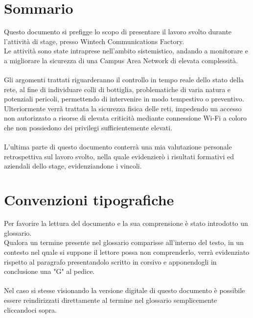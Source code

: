 \documentclass[Tesi.tex]{subfiles}
\begin{document}
\clearpage\thispagestyle{empty}
	
\renewcommand{\chaptername}{}
\renewcommand{\thechapter}{}
\chapter{Sommario}
Questo documento si prefigge lo scopo di presentare il lavoro svolto durante l'attività di stage, presso Wintech Communications Factory. \\
Le attività sono state intraprese nell'ambito sistemistico, andando a monitorare e a migliorare la sicurezza di una Campus Area Network di elevata complessità. \\\\

Gli argomenti trattati riguarderanno il controllo in tempo reale dello stato della rete, al fine di individuare colli di bottiglia, problematiche di varia natura e potenziali pericoli, permettendo di intervenire in modo tempestivo o preventivo.\\
Ulteriormente verrà trattata la sicurezza fisica delle reti, impedendo un accesso non autorizzato a risorse di elevata criticità mediante connessione Wi-Fi a coloro che non possiedono dei privilegi sufficientemente elevati. \\\\

L'ultima parte di questo documento conterrà una mia valutazione personale retrospettiva sul lavoro svolto, nella quale evidenzierò i risultati formativi ed aziendali dello stage, evidenziandone i vincoli. \\

\newpage
\chapter{Convenzioni tipografiche}
Per favorire la lettura del documento e la sua comprensione è stato introdotto un glossario. \\
Qualora un termine presente nel glossario comparisse all'interno del testo, in un contesto nel quale si suppone il lettore possa non comprenderlo, verrà evidenziato rispetto al paragrafo presentandolo scritto in corsivo e apponendogli in conclusione una "G" al pedice. \\\\
Nel caso si stesse visionando la versione digitale di questo documento è possibile essere reindirizzati direttamente al termine nel glossario semplicemente cliccandoci sopra. \\


\clearpage
\end{document}
